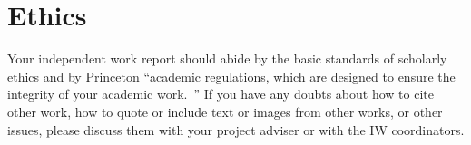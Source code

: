 \documentclass[pageno]{jpaper}
\begin{document}
\section{Ethics}

Your independent work report should abide by the basic standards of scholarly ethics and by Princeton ``academic regulations, which are designed to ensure the integrity of your academic work.~\cite{odoc}'' If you have any doubts about how to cite
other work, how to quote or include text or images from other works, or other issues, please discuss them with your project adviser or with the IW coordinators.





\end{document}
